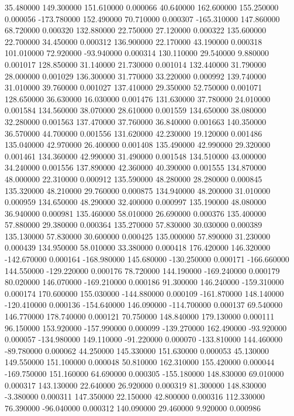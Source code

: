35.480000 149.300000 151.610000 0.000066 
40.640000 162.600000 155.250000 0.000056 
-173.780000 152.490000 70.710000 0.000307 
-165.310000 147.860000 68.720000 0.000320 
132.880000 22.750000 27.120000 0.000322 
135.600000 22.700000 34.450000 0.000312 
136.900000 22.170000 43.190000 0.000318 
101.010000 72.920000 -93.940000 0.000314 
130.110000 29.540000 9.880000 0.001017 
128.850000 31.140000 21.730000 0.001014 
132.440000 31.790000 28.000000 0.001029 
136.300000 31.770000 33.220000 0.000992 
139.740000 31.010000 39.760000 0.001027 
137.410000 29.350000 52.750000 0.001071 
128.650000 36.630000 16.030000 0.001476 
131.630000 37.780000 24.010000 0.001584 
134.560000 38.070000 28.610000 0.001559 
134.650000 38.080000 32.280000 0.001563 
137.470000 37.760000 36.840000 0.001663 
140.350000 36.570000 44.700000 0.001556 
131.620000 42.230000 19.120000 0.001486 
135.040000 42.970000 26.400000 0.001408 
135.490000 42.990000 29.320000 0.001461 
134.360000 42.990000 31.490000 0.001548 
134.510000 43.000000 34.240000 0.001556 
137.890000 42.360000 40.390000 0.001555 
134.870000 48.000000 22.310000 0.000912 
135.590000 48.280000 28.280000 0.000845 
135.320000 48.210000 29.760000 0.000875 
134.940000 48.200000 31.010000 0.000959 
134.650000 48.290000 32.400000 0.000997 
135.190000 48.080000 36.940000 0.000981 
135.460000 58.010000 26.690000 0.000376 
135.400000 57.880000 29.380000 0.000364 
135.270000 57.830000 30.030000 0.000389 
135.130000 57.830000 30.600000 0.000425 
135.000000 57.890000 31.230000 0.000439 
134.950000 58.010000 33.380000 0.000418 
176.420000 146.320000 -142.670000 0.000164 
-168.980000 145.680000 -130.250000 0.000171 
-166.660000 144.550000 -129.220000 0.000176 
78.720000 144.190000 -169.240000 0.000179 
80.020000 146.070000 -169.210000 0.000186 
91.300000 146.240000 -159.310000 0.000174 
170.600000 155.030000 -144.880000 0.000109 
-161.870000 148.140000 -120.410000 0.000136 
-154.640000 146.090000 -114.700000 0.000137 
69.540000 146.770000 178.740000 0.000121 
70.750000 148.840000 179.130000 0.000111 
96.150000 153.920000 -157.990000 0.000099 
-139.270000 162.490000 -93.920000 0.000057 
-134.980000 149.110000 -91.220000 0.000070 
-133.810000 144.460000 -89.780000 0.000062 
44.250000 145.330000 151.630000 0.000053 
45.130000 149.550000 151.100000 0.000048 
50.810000 162.310000 155.420000 0.000044 
-169.750000 151.160000 64.690000 0.000305 
-155.180000 148.830000 69.010000 0.000317 
143.130000 22.640000 26.920000 0.000319 
81.300000 148.830000 -3.380000 0.000311 
147.350000 22.150000 42.800000 0.000316 
112.330000 76.390000 -96.040000 0.000312 
140.090000 29.460000 9.920000 0.000986 
